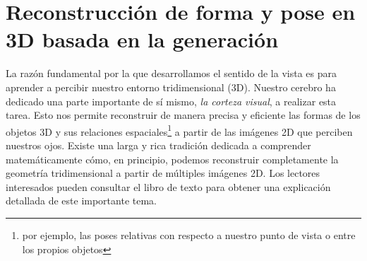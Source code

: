 \documentclass[../../book-main_es.tex]{subfiles}
\begin{document}
\section{Reconstrucción de forma y pose en 3D basada 
en la generación}\label{sec:CUPID}\label{sec:shape-and-pose}

\newcommand{\pose}{\boldsymbol{\theta}}
\newcommand{\object}{\mathcal{O}}
\newcommand{\Image}{\boldsymbol{I}}
\newcommand{\image}{\vI}
\newcommand{\render}{\boldsymbol{\mathcal{P}}}
\newcommand{\latent}{\boldsymbol{z}}
\newcommand{\timestep}{t}
\newcommand{\latentt}{\boldsymbol{z}_{\timestep}}
\newcommand{\latentzero}{\boldsymbol{z}_{0}}
\newcommand{\noise}{\boldsymbol{\epsilon}}
\newcommand{\velocity}{\boldsymbol{v}}
\newcommand{\parameter}{\phi}
\newcommand{\encoder}{\varphi}
\newcommand{\point}{\boldsymbol{x}}
\newcommand{\pixcoord}{\boldsymbol{u}}
\newcommand{\feat}{\boldsymbol{f}}
\newcommand{\sflow}{\boldsymbol{\mathcal{G}_{S}}}
\newcommand{\lflow}{\boldsymbol{\mathcal{G}_{L}}}
\newcommand{\transpose}{\operatorname{T}}
\newcommand{\Grid}{\mG}
\newcommand{\sgrid}{\mS}
\newcommand{\numpts}{L}
\newcommand{\sres}{D}
\newcommand{\vaeencoder}{\psi}
\newcommand{\trellis}{{\textsc{TRELLIS}}\xspace}
\newcommand{\interp}{\operatorname{BilinearInterp}}
\newcommand{\slatenc}{\operatorname{SlatEncoder}}
\newcommand{\twotothree}{$2$D $\to$ $3$D\xspace}
\newcommand{\threetotwo}{$2$D $\to$ $3$D\xspace}
\newcommand{\low}{\mathrm{l}}
\newcommand{\high}{\mathrm{h}}



La razón fundamental por la que desarrollamos el sentido de la vista es para aprender a percibir 
nuestro entorno tridimensional (3D). Nuestro cerebro ha dedicado una parte importante de sí mismo, 
{\em la corteza visual}, a realizar esta tarea. Esto nos permite reconstruir de manera precisa y 
eficiente las formas de los objetos 3D y sus relaciones espaciales\footnote{por ejemplo, las 
  poses relativas con respecto a nuestro punto de vista o entre los 
propios objetos} a partir de las imágenes 2D que perciben nuestros ojos. Existe una larga y rica 
tradición dedicada a comprender matemáticamente cómo, en principio, podemos reconstruir 
completamente la geometría tridimensional a partir de múltiples imágenes 2D. 
Los lectores interesados pueden consultar el libro de texto \cite{MaY2003} para obtener 
una explicación detallada de este importante tema.
\end{document}

